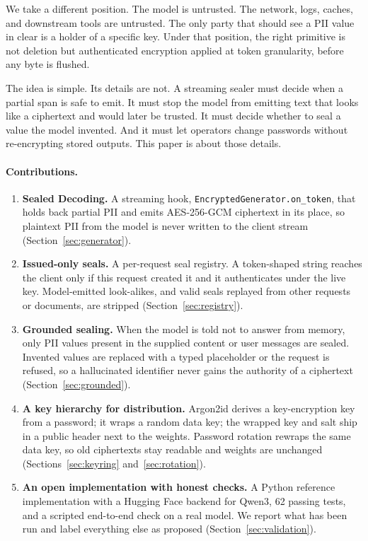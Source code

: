 \documentclass[11pt]{article}
\newcommand{\code}[1]{\texttt{#1}}
\begin{document}
We take a different position. The model is untrusted. The network, logs, caches, and downstream tools are untrusted. The only party that should see a PII value in clear is a holder of a specific key. Under that position, the right primitive is not deletion but authenticated encryption applied at token granularity, before any byte is flushed.

The idea is simple. Its details are not. A streaming sealer must decide when a partial span is safe to emit. It must stop the model from emitting text that looks like a ciphertext and would later be trusted. It must decide whether to seal a value the model invented. And it must let operators change passwords without re-encrypting stored outputs. This paper is about those details.

\paragraph{Contributions.}
\begin{enumerate}
  \item \textbf{Sealed Decoding.} A streaming hook, \code{EncryptedGenerator.on\_token}, that holds back partial PII and emits AES-256-GCM ciphertext in its place, so plaintext PII from the model is never written to the client stream (Section~\ref{sec:generator}).
  \item \textbf{Issued-only seals.} A per-request seal registry. A token-shaped string reaches the client only if this request created it and it authenticates under the live key. Model-emitted look-alikes, and valid seals replayed from other requests or documents, are stripped (Section~\ref{sec:registry}).
  \item \textbf{Grounded sealing.} When the model is told not to answer from memory, only PII values present in the supplied content or user messages are sealed. Invented values are replaced with a typed placeholder or the request is refused, so a hallucinated identifier never gains the authority of a ciphertext (Section~\ref{sec:grounded}).
  \item \textbf{A key hierarchy for distribution.} Argon2id derives a key-encryption key from a password; it wraps a random data key; the wrapped key and salt ship in a public header next to the weights. Password rotation rewraps the same data key, so old ciphertexts stay readable and weights are unchanged (Sections~\ref{sec:keyring} and~\ref{sec:rotation}).
  \item \textbf{An open implementation with honest checks.} A Python reference implementation with a Hugging Face backend for Qwen3, 62 passing tests, and a scripted end-to-end check on a real model. We report what has been run and label everything else as proposed (Section~\ref{sec:validation}).
\end{enumerate}
\end{document}
